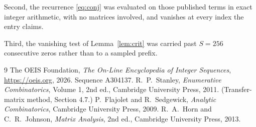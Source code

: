 \documentclass[11pt,a4paper]{article}
\theoremstyle{plain}
\theoremstyle{definition}
\begin{document}
Second, the recurrence \eqref{eq:conj} was evaluated on those published terms in exact
integer arithmetic, with no matrices involved, and vanishes at every index the entry claims.

Third, the vanishing test of Lemma~\ref{lem:crit} was carried past $S=256$ consecutive
zeros rather than to a sampled prefix.

\begin{thebibliography}{9}
 The OEIS Foundation, \emph{The On-Line Encyclopedia of Integer
Sequences}, \url{https://oeis.org}, 2026. Sequence A304137.
 R.~P.~Stanley, \emph{Enumerative Combinatorics}, Volume 1, 2nd ed.,
Cambridge University Press, 2011. (Transfer-matrix method, Section 4.7.)
 P.~Flajolet and R.~Sedgewick, \emph{Analytic Combinatorics}, Cambridge
University Press, 2009.
 R.~A.~Horn and C.~R.~Johnson, \emph{Matrix Analysis}, 2nd ed., Cambridge
University Press, 2013.
\end{thebibliography}
\end{document}
